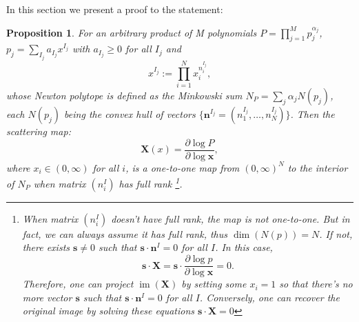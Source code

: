 \documentclass[12pt]{article}
\theoremstyle{definition}
\theoremstyle{plain}
\newtheorem{pro}[para]{Proposition}
\begin{document}
In this section we present a proof to the statement:
\begin{pro}
For an arbitrary product of M polynomials $P=\prod_{j=1}^M p_j^{\alpha_j}$, $p_j=\sum_{I_j} a_{I_j} x^{I_j}$ with $a_{I_j}\geq 0$ for all $I_j$ and
 \[
	x^{I_j}:=\prod_{i=1}^N x_i^{n^{I_j}_i},
\]
whose Newton polytope is defined as the Minkowski sum  $N_P=\sum_j \alpha_j N(p_j)$, each $N(p_j)$ being the convex hull of vectors $\{\mathbf{n}^{I_j}=(n^{I_j}_1,\dots,n^{I_j}_N)\}$. Then the scattering map:
\[
	\mathbf X(x)=\frac{\partial \log P}{\partial \log \mathbf x},
\]
where $x_i\in (0,\infty)$ for all $i$, is a one-to-one map from $(0,\infty)^N$ to the interior of $N_P$ when matrix $(n_i^I)$ has full rank
\footnote{When matrix $(n_i^I)$ doesn't have full rank, the map is not one-to-one. But in fact, we can always assume it has full rank, thus $\dim (N(p))=N$. If not, there exists $\mathbf s\neq 0$ such that $\mathbf s \cdot \mathbf n^I=0$ for all $I$. In this case,
\[
	\mathbf s\cdot\mathbf X=\mathbf s\cdot\frac{\partial \log p}{\partial \log \mathbf x}=0.
\]
Therefore, one can project $\operatorname{im}(\mathbf X)$ by setting some $x_i=1$ so that there's no more vector $\mathbf s$ such that $\mathbf s\cdot \mathbf n^I=0$ for all $I$. Conversely, one can recover the original image by solving these equations $\mathbf s\cdot\mathbf X=0$}. 

\end{pro}
\end{document}
